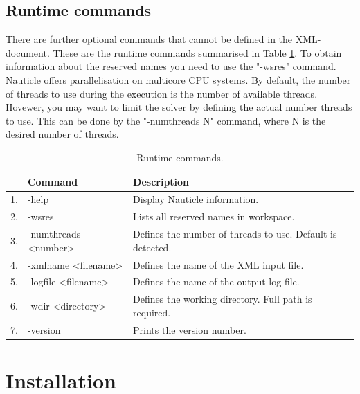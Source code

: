 \documentclass[a4paper,12pt,openany]{book}
\theoremstyle{break}
\begin{document}
\subsection{Runtime commands}
There are further optional commands that cannot be defined in the XML-document. These are the runtime commands summarised in Table \ref{tbl:runtime_commands}. To obtain information about the reserved names you need to use the "-wsres" command. Nauticle offers parallelisation on multicore CPU systems. By default, the number of threads to use during the execution is the number of available threads. Hovewer, you may want to limit the solver by defining the actual number threads to use. This can be done by the "-numthreads N" command, where N is the desired number of threads. 
\begin{table} [h]
\begin{center}
\caption{Runtime commands.} \label{tbl:runtime_commands}
\begin{tabular}{ l l l }
\toprule[1.5pt]
\bf  & \bf Command & \bf Description\\
\midrule
1. & -help & Display Nauticle information. \\
2. & -wsres & Lists all reserved names in workspace. \\
3. & -numthreads <number> & Defines the number of threads to use. Default is detected. \\
4. & -xmlname <filename> & Defines the name of the XML input file. \\
5. & -logfile <filename> & Defines the name of the output log file. \\
6. & -wdir <directory> & Defines the working directory. Full path is required. \\
7. & -version & Prints the version number. \\
\bottomrule[1.25pt]
\end{tabular}
\end{center}
\end{table}

\section{Installation}
\end{document}
